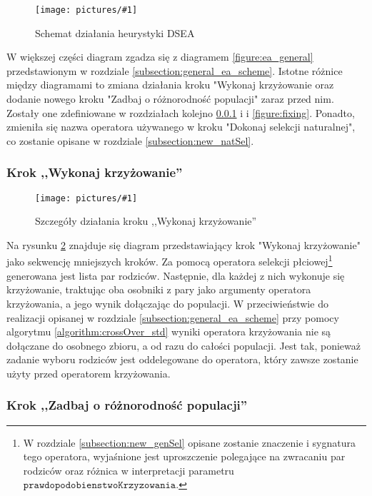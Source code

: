 \documentclass[twoside]{iisthesis}
\newcommand{\param}{\mathtt}
\newcommand{\img}[1]{\texttt{[image: pictures/\#1]}}
\begin{document}
\begin{figure}[H]
	\caption{Schemat działania heurystyki DSEA \label{figure:dsea}}
	\img{dsea.png}
\end{figure}

W większej części diagram zgadza się z diagramem \ref{figure:ea_general} przedstawionym w rozdziale \ref{subsection:general_ea_scheme}. Istotne różnice między diagramami to zmiana działania kroku "Wykonaj krzyżowanie oraz dodanie nowego kroku "Zadbaj o różnorodność populacji" zaraz przed nim. Zostały one zdefiniowane w rozdziałach kolejno \ref{subsubsection:my_crossover} i  i \ref{figure:fixing}. Ponadto, zmieniła się nazwa operatora używanego w kroku "Dokonaj selekcji naturalnej", co zostanie opisane w rozdziale \ref{subsection:new_natSel}.

\newpage

\subsubsection{Krok ,,Wykonaj krzyżowanie''} \label{subsubsection:my_crossover}

\begin{figure}[H]
	\caption{Szczegóły działania kroku ,,Wykonaj krzyżowanie'' \label{figure:my_crossover}}
	\img{my_crossover.png}
\end{figure}

Na rysunku \ref{figure:my_crossover} znajduje się diagram przedstawiający krok "Wykonaj krzyżowanie" jako sekwencję mniejszych kroków. Za pomocą operatora selekcji płciowej\footnote{W rozdziale \ref{subsection:new_genSel} opisane zostanie znaczenie i sygnatura tego operatora, wyjaśnione jest uproszczenie polegające na zwracaniu par rodziców oraz różnica w interpretacji parametru $\param{prawdopodobienstwoKrzyzowania}$. } generowana jest lista par rodziców. Następnie, dla każdej z nich wykonuje się krzyżowanie, traktując oba osobniki z pary jako argumenty operatora krzyżowania, a jego wynik dołączając do populacji. W przeciwieństwie do realizacji opisanej w rozdziale \ref{subsection:general_ea_scheme} przy pomocy algorytmu \ref{algorithm:crossOver_std} wyniki operatora krzyżowania nie są dołączane do osobnego zbioru, a od razu do całości populacji. Jest tak, ponieważ zadanie wyboru rodziców jest oddelegowane do operatora, który zawsze zostanie użyty przed operatorem krzyżowania.

\subsubsection{Krok ,,Zadbaj o różnorodność populacji''} \label{subsubsection:fixing}
\end{document}
